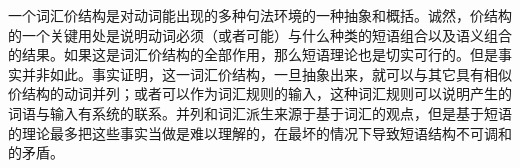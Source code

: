     一个词汇价结构是对动词能出现的多种句法环境的一种抽象和概括。诚然，价结构的一个关键用处是说明动词必须（或者可能）与什么种类的短语组合以及语义组合的结果。如果这是词汇价结构的全部作用，那么短语理论也是切实可行的。但是事实并非如此。事实证明，这一词汇价结构，一旦抽象出来，就可以与其它具有相似价结构的动词并列；或者可以作为词汇规则的输入，这种词汇规则可以说明产生的词语与输入有系统的联系。并列和词汇派生来源于基于词汇的观点，但是基于短语的理论最多把这些事实当做是难以理解的，在最坏的情况下导致短语结构不可调和的矛盾。

%
%
%

